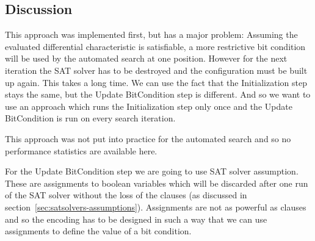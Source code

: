 \subsection{Discussion}
\label{sec:simple-evaluation-discussion}
%
This approach was implemented first, but has a major problem: Assuming the evaluated differential characteristic is satisfiable, a more restrictive bit condition will be used by the automated search at one position. However for the next iteration the SAT solver has to be destroyed and the configuration must be built up again. This takes a long time. We can use the fact that the Initialization step stays the same, but the Update BitCondition step is different. And so we want to use an approach which runs the Initialization step only once and the Update BitCondition is run on every search iteration.

This approach was not put into practice for the automated search and so no performance statistics are available here.

For the Update BitCondition step we are going to use SAT solver assumption. These are assignments to boolean variables which will be discarded after one run of the SAT solver without the loss of the clauses (as discussed in section~\ref{sec:satsolvers-assumptions}). Assignments are not as powerful as clauses and so the encoding has to be designed in such a way that we can use assignments to define the value of a bit condition.

